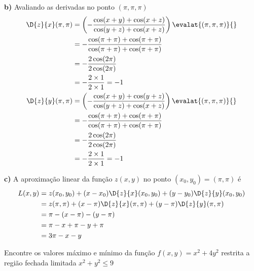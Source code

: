 \documentclass[a4paper,12pt,fleqn]{article}
\begin{document}
\begin{answer}
\vspace{\baselineskip}
\textbf{b)\;}
Avaliando as derivadas no ponto \((\pi, \pi, \pi)\)
\begin{align*}
  \D{z}{x}(\pi, \pi)
  & = \left(-\frac{\cos(x+y)+\cos(x+z)}{\cos(y+z)+\cos(x+z)}\right)\evalat{(\pi, \pi, \pi)}{} \\
  & = -\frac{\cos(\pi+\pi)+\cos(\pi+\pi)}{\cos(\pi+\pi)+\cos(\pi+\pi)} \\
  & = -\frac{2\cos(2\pi)}{2\cos(2\pi)}  \\
  & = -\frac{2\times 1}{2\times 1}  = -1
  \\
  \D{z}{y}(\pi, \pi)
  & = \left(-\frac{\cos(x+y)+\cos(y+z)}{\cos(y+z)+\cos(x+z)}\right)\evalat{(\pi, \pi, \pi)}{} \\
  & = -\frac{\cos(\pi+\pi)+\cos(\pi+\pi)}{\cos(\pi+\pi)+\cos(\pi+\pi)} \\
  & = -\frac{2\cos(2\pi)}{2\cos(2\pi)}  \\
  & = -\frac{2\times 1}{2\times 1}  = -1
\end{align*}

\vspace{\baselineskip}
\textbf{c)\;}
A aproximação linear da função $z(x, y)$ no ponto \((x_0, y_0) = (\pi, \pi)\) é
\begin{align*}
  L(x, y)
  & = z(x_0, y_0) + (x-x_0)\D{z}{x}(x_0, y_0) + (y-y_0)\D{z}{y}(x_0, y_0) \\
  & = z(\pi, \pi) + (x-\pi)\D{z}{x}(\pi, \pi) + (y-\pi)\D{z}{y}(\pi, \pi) \\
  & = \pi -(x-\pi) - (y-\pi) \\
  & = \pi -x +\pi -y +\pi \\
  & = 3\pi -x -y
\end{align*}
\end{answer}

Encontre os valores máximo e mínimo da função
\(
  f(x, y) = x^2 + 4y^2
\)
restrita a região fechada limitada
\(
  x^2 + y^2 \leq 9
\)
\clearpagequestiononly
\end{document}
